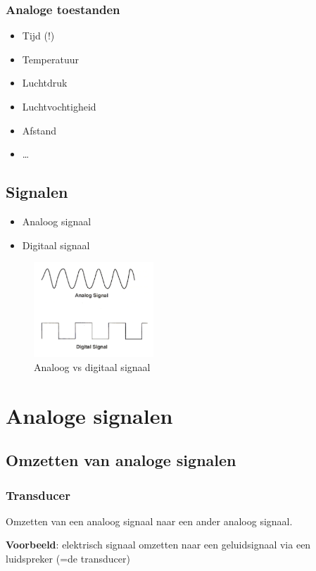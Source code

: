 \documentclass{article}
\newcommand{\bold}[1]{\textbf{#1}}
\begin{document}
\subsubsection{Analoge toestanden}
\begin{itemize}
    \item Tijd (!)
    \item Temperatuur
    \item Luchtdruk
    \item Luchtvochtigheid
    \item Afstand
    \item \dots
\end{itemize}


\subsection{Signalen}
\begin{itemize}
    \item Analoog signaal
    \item Digitaal signaal
\end{itemize}

\begin{figure}[H]
    \centering
    \includegraphics[width=0.4\textwidth]{Screenshot_20200217_115642.png}
    \caption{Analoog vs digitaal signaal}
\end{figure}


\section{Analoge signalen}
\subsection{Omzetten van analoge signalen}
\subsubsection{Transducer}
Omzetten van een analoog signaal naar een ander analoog signaal.

\bold{Voorbeeld}: elektrisch signaal omzetten naar een geluidsignaal via een luidspreker (=de transducer)
\end{document}
